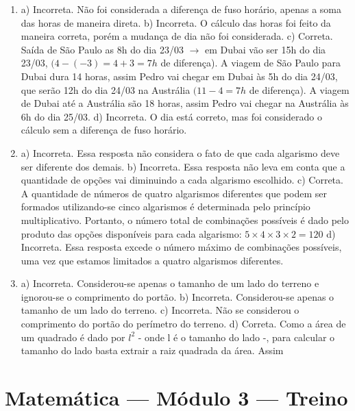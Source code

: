 \begin{enumerate}
\item a) Incorreta. Não foi considerada a diferença de fuso horário, apenas a soma das horas de maneira direta.
b) Incorreta. O cálculo das horas foi feito da maneira correta, porém a mudança de dia não foi considerada.
c) Correta. Saída de São Paulo as 8h do dia 23/03 $\rightarrow$ em Dubai vão ser
15h do dia 23/03, $(4 - ( - 3) = 4 + 3 = 7h$ de diferença). A viagem de São Paulo para Dubai dura 14 horas, assim Pedro vai chegar
em Dubai às 5h do dia 24/03, que serão 12h do dia 24/03 na Austrália
$(11 - 4 = 7{h}$ de diferença). A viagem de Dubai até a Austrália são 18 horas, assim Pedro vai chegar
na Austrália às 6h do dia 25/03.
d) Incorreta. O dia está correto, mas foi considerado o cálculo sem a diferença de fuso horário.


\item a) Incorreta. Essa resposta não considera o fato de que cada algarismo deve ser diferente dos demais.
b) Incorreta. Essa resposta não leva em conta que a quantidade de opções vai diminuindo a cada algarismo escolhido.
c) Correta. A quantidade de números de quatro algarismos
diferentes que podem ser formados utilizando-se cinco algarismos é determinada pelo princípio multiplicativo. Portanto, o número total de
combinações possíveis é dado pelo produto das opções disponíveis para
cada algarismo: $5 \times 4\times 3\times 2  = 120$
d) Incorreta. Essa resposta excede o número máximo de combinações possíveis, uma vez que estamos limitados a quatro algarismos diferentes.


\item a) Incorreta. Considerou-se apenas o tamanho de um lado do terreno e ignorou-se o comprimento do portão.
b) Incorreta. Considerou-se apenas o tamanho de um lado do terreno.
c) Incorreta. Não se considerou o comprimento do portão do perímetro do terreno.
d) Correta. Como a área de um quadrado é dado por $l^2$ - onde l é o tamanho do lado -, para calcular o tamanho do lado basta extrair a raiz quadrada da área. Assim
\end{enumerate}

\section*{Matemática — Módulo 3 — Treino}


